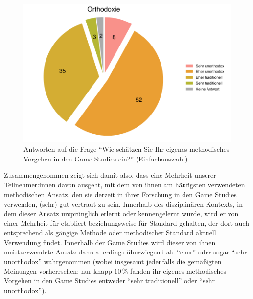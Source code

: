 \documentclass{scrartcl}
\begin{document}
\begin{figure}[t]
   \includegraphics[width=1\textwidth]{orthodoxie.pdf}
   \caption{Antworten auf die Frage \enquote{Wie schätzen Sie Ihr eigenes methodisches Vorgehen in den Game Studies ein?} (Einfachauswahl)}
   \label{fig:orthodoxie}
\end{figure}

Zusammengenommen zeigt sich damit also, dass eine Mehrheit unserer Teilnehmer:in\-nen davon ausgeht, mit dem von ihnen am häufigsten verwendeten methodischen Ansatz, den sie derzeit in ihrer Forschung in den Game Studies verwenden, (sehr) gut vertraut zu sein.
Innerhalb des disziplinären Kontexts, in dem dieser Ansatz ursprünglich erlernt oder kennengelernt wurde, wird er von einer Mehrheit für etabliert beziehungsweise für Standard gehalten, der dort auch entsprechend als gängige Methode oder methodischer Standard aktuell Verwendung findet.
Innerhalb der Game Studies wird dieser von ihnen meistverwendete Ansatz dann allerdings überwiegend als \enquote{eher} oder sogar \enquote{sehr unorthodox} wahrgenommen (wobei insgesamt jedenfalls die gemäßigten Meinungen vorherrschen; nur knapp $10\,\%$ fanden ihr eigenes methodisches Vorgehen in den Game Studies entweder \enquote{sehr traditionell} oder \enquote{sehr unorthodox}).


\end{document}
